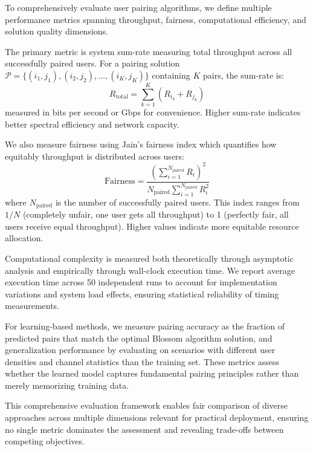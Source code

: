 To comprehensively evaluate user pairing algorithms, we define multiple performance metrics spanning throughput, fairness, computational efficiency, and solution quality dimensions.

The primary metric is system sum-rate measuring total throughput across all successfully paired users. For a pairing solution $\mathcal{P} = \{(i_1, j_1), (i_2, j_2), \ldots, (i_K, j_K)\}$ containing $K$ pairs, the sum-rate is:
\begin{equation}
R_{\text{total}} = \sum_{k=1}^{K} \left( R_{i_k} + R_{j_k} \right)
\end{equation}
measured in bits per second or Gbps for convenience. Higher sum-rate indicates better spectral efficiency and network capacity.

We also measure fairness using Jain's fairness index which quantifies how equitably throughput is distributed across users:
\begin{equation}
\text{Fairness} = \frac{\left(\sum_{i=1}^{N_{\text{paired}}} R_i\right)^2}{N_{\text{paired}} \sum_{i=1}^{N_{\text{paired}}} R_i^2}
\end{equation}
where $N_{\text{paired}}$ is the number of successfully paired users. This index ranges from $1/N$ (completely unfair, one user gets all throughput) to 1 (perfectly fair, all users receive equal throughput). Higher values indicate more equitable resource allocation.

Computational complexity is measured both theoretically through asymptotic analysis and empirically through wall-clock execution time. We report average execution time across 50 independent runs to account for implementation variations and system load effects, ensuring statistical reliability of timing measurements.

For learning-based methods, we measure pairing accuracy as the fraction of predicted pairs that match the optimal Blossom algorithm solution, and generalization performance by evaluating on scenarios with different user densities and channel statistics than the training set. These metrics assess whether the learned model captures fundamental pairing principles rather than merely memorizing training data.

This comprehensive evaluation framework enables fair comparison of diverse approaches across multiple dimensions relevant for practical deployment, ensuring no single metric dominates the assessment and revealing trade-offs between competing objectives.
